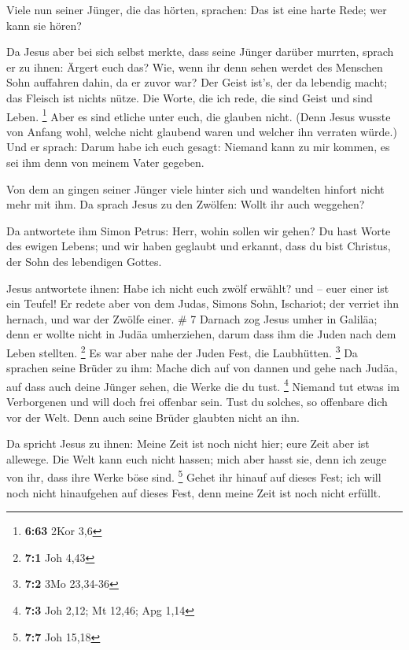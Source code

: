  Viele nun seiner Jünger, die das hörten, sprachen: Das
ist eine harte Rede; wer kann sie hören?

 Da Jesus aber bei sich selbst merkte, dass seine Jünger
darüber murrten, sprach er zu ihnen: Ärgert euch das? 
Wie, wenn ihr denn sehen werdet des Menschen Sohn auffahren dahin, da er
zuvor war?  Der Geist ist's, der da lebendig macht; das
Fleisch ist nichts nütze. Die Worte, die ich rede, die sind Geist und
sind Leben. \footnote{\textbf{6:63} 2Kor 3,6}  Aber es
sind etliche unter euch, die glauben nicht. (Denn Jesus wusste von
Anfang wohl, welche nicht glaubend waren und welcher ihn verraten
würde.)  Und er sprach: Darum habe ich euch gesagt:
Niemand kann zu mir kommen, es sei ihm denn von meinem Vater gegeben.

 Von dem an gingen seiner Jünger viele hinter sich und
wandelten hinfort nicht mehr mit ihm.  Da sprach Jesus zu
den Zwölfen: Wollt ihr auch weggehen?

 Da antwortete ihm Simon Petrus: Herr, wohin sollen wir
gehen? Du hast Worte des ewigen Lebens;  und wir haben
geglaubt und erkannt, dass du bist Christus, der Sohn des lebendigen
Gottes.

 Jesus antwortete ihnen: Habe ich nicht euch zwölf
erwählt? und -- euer einer ist ein Teufel!  Er redete
aber von dem Judas, Simons Sohn, Ischariot; der verriet ihn hernach, und
war der Zwölfe einer. \# 7  Darnach zog Jesus umher in
Galiläa; denn er wollte nicht in Judäa umherziehen, darum dass ihm die
Juden nach dem Leben stellten. \footnote{\textbf{7:1} Joh 4,43}
 Es war aber nahe der Juden Fest, die Laubhütten.
\footnote{\textbf{7:2} 3Mo 23,34-36}  Da sprachen seine
Brüder zu ihm: Mache dich auf von dannen und gehe nach Judäa, auf dass
auch deine Jünger sehen, die Werke die du tust. \footnote{\textbf{7:3}
  Joh 2,12; Mt 12,46; Apg 1,14}  Niemand tut etwas im
Verborgenen und will doch frei offenbar sein. Tust du solches, so
offenbare dich vor der Welt.  Denn auch seine Brüder
glaubten nicht an ihn.

 Da spricht Jesus zu ihnen: Meine Zeit ist noch nicht
hier; eure Zeit aber ist allewege.  Die Welt kann euch
nicht hassen; mich aber hasst sie, denn ich zeuge von ihr, dass ihre
Werke böse sind. \footnote{\textbf{7:7} Joh 15,18}  Gehet
ihr hinauf auf dieses Fest; ich will noch nicht hinaufgehen auf dieses
Fest, denn meine Zeit ist noch nicht erfüllt.

